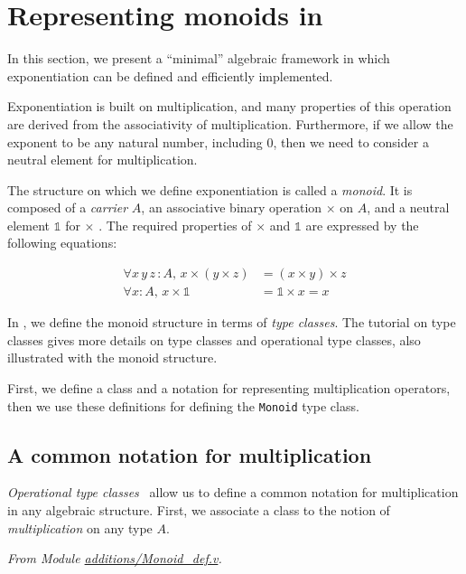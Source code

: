 \section{Representing monoids in \coq \label{monoid-class-def}}

In this section, we present a ``minimal'' algebraic framework in which  exponentiation can be defined and efficiently implemented.

Exponentiation is built on multiplication, and many properties of 
this operation are derived from the associativity of multiplication. 
Furthermore, if we allow the exponent to be any natural number, including $0$, 
then we need to consider a neutral element for multiplication.

The structure on which we define exponentiation is called a \emph{monoid}.
It is composed of a \emph{carrier} $A$, an associative binary operation $\times$ on $A$, and a neutral element $\mathds{1}$ for $\times$ . The required properties of $\times$ and
$\mathds{1}$ are expressed by the following equations:


\begin{align}
  \label{eq}
  \forall x\,y\,z\,:A,\, x\times (y \times z) &= (x\times y) \times z
  \\
\forall x:A,\, x \times \mathds{1}  &= \mathds{1}  \times x = x
\end{align}


In \coq{}, we define the monoid structure in terms of 
\emph{type classes}\cite{MS08,BS2011}. The tutorial on type classes \cite{PCMS} gives more details on type classes and
operational type classes, also illustrated with the monoid structure.


First, we define a class and a notation for representing multiplication operators, then we use
these definitions for defining the \texttt{Monoid} type class.

\subsection{A common notation for multiplication}
\label{op-classes}

\emph{Operational type classes}~\cite{BS2011}
allow us to define a common notation 
for multiplication in any algebraic structure. 
First, we associate a class to the notion of \emph{multiplication} 
on any type $A$.

\emph{From Module \href{../theories/html/additions.Monoid_def.html}{additions/Monoid\_def.v}.}

